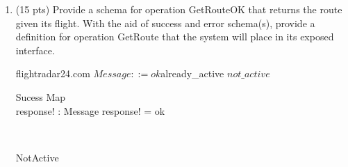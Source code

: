 \documentclass[12pt]{article}
\begin{document}
\begin{enumerate}
	      \begin{class}{flightradar24.com}
		      \indent $Message::= ok $\mid already\_active$ $ \\
		      \begin{schema}{Sucess}
			      \Xi RegisterFlight\\
			      response! : Message
			      \where
			      response! = ok
		      \end{schema} \\
		      \begin{schema}{AlreadyActive}
			      \Xi RegisterFlight\\
			      newFlight?: FLIGHT\_NUMBER \\
			      response! = Message
			      \where
			      newFlight \in active \\
			      response! = already\_active
		      \end{schema} \\
		      \begin{schema}{RegisterFlightOK}
			      \Delta (map,active)\\
			      newFlight?: FLIGHT\_NUMBER \\
			      ROUTE? = ROUTE
			      \where
			      newFlight \notin active \\
			      active' = active \cup \{ newFlight? \} \\
			      map' = map \cup \{ newFlight? \mapsto ROUTE? \} \\
		      \end{schema} \\
		      RegisterFlight ~\hat{=}~ (RegisterFlightOK \wedge Success) \oplus (AlreadyActive)
	      \end{class}
	      \newpage
	\item (15 pts) Provide a schema for operation GetRouteOK that returns the route given its
	      flight. With the aid of success and error schema(s), provide a definition for operation
	      GetRoute that the system will place in its exposed interface.
	      \begin{class}{flightradar24.com}
		      \indent $Message::= ok $\mid already\_active \mid$ not\_active $ \\
		      \begin{schema}{Sucess}
			      \Xi Map\\
			      response! : Message
			      \where
			      response! = ok
		      \end{schema} \\
		      \begin{schema}{NotActive}

\end{schema}
\end{class}
\end{enumerate}
\end{document}
